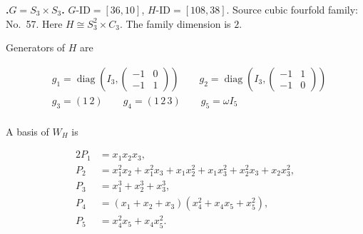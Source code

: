 \documentclass[12pt]{amsart}
\numberwithin{equation}{section}
\theoremstyle{plain}
\theoremstyle{definition}
\theoremstyle{remark}
\DeclareMathOperator{\diag}{diag}
\newenvironment{familydisplay}{%
  \begingroup
  \setlength{\arraycolsep}{1.35pt}%
  \renewcommand{\arraystretch}{0.96}%
  \setlength{\jot}{2pt}%
}{\endgroup}
\newcommand{\smat}[1]{\left(\begin{smallmatrix}#1\end{smallmatrix}\right)}
\begin{document}
\par{}\medskip\noindent\textbf{.\enspace $G=S_3\times S_3$.}\label{fam:threefold-no-12}
$G\text{-ID}=[36,10]$, $H\text{-ID}=[108,38]$.
Source cubic fourfold family: No.~57.  Here
$H\cong S_3^2\times C_3$.
The family dimension is $2$.
\par\smallskip\noindent Generators of $H$ are\par\nopagebreak
\begin{familydisplay}
\begin{align*}
&g_{1}=\diag\!\left(I_3,\smat{-1&0\\-1&1}\right)
\qquad g_{2}=\diag\!\left(I_3,\smat{-1&1\\-1&0}\right)\\
&g_{3}=(1\,2)\qquad g_{4}=(1\,2\,3)\qquad g_{5}=\omega I_5\\
\end{align*}
\end{familydisplay}
\par\smallskip\noindent A basis of $W_H$ is\par\nopagebreak
\begin{familydisplay}
\begin{alignat*}{2}
P_{1}&=x_{1}x_{2}x_{3},\\[2pt]
P_{2}&=x_{1}^{2}x_{2}+x_{1}^{2}x_{3}+x_{1}x_{2}^{2}+x_{1}x_{3}^{2}+x_{2}^{2}x_{3}+x_{2}x_{3}^{2},\\[2pt]
P_{3}&=x_{1}^{3}+x_{2}^{3}+x_{3}^{3},\\[2pt]
P_{4}&=(x_{1}+x_{2}+x_{3})(x_{4}^{2}+x_{4}x_{5}+x_{5}^{2}),\\[2pt]
P_{5}&=x_{4}^{2}x_{5}+x_{4}x_{5}^{2}.\\[2pt]
\end{alignat*}
\end{familydisplay}
\end{document}
